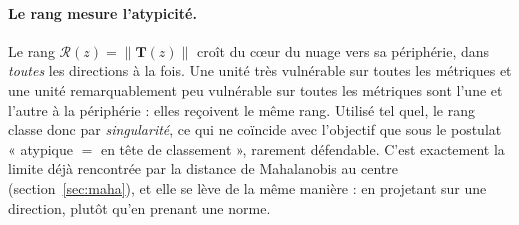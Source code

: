 \documentclass[11pt,a4paper]{article}
\theoremstyle{definition}
\theoremstyle{remark}
\newcommand{\norm}[1]{\left\lVert #1 \right\rVert}
\newcommand{\Tmap}{\mathbf{T}}
\begin{document}
\medskip

\paragraph{Le rang mesure l'atypicité.} Le rang $\mathcal{R}(z) = \norm{\Tmap(z)}$ croît du
c\oe ur du nuage vers sa périphérie, dans \emph{toutes} les directions à la fois. Une unité
très vulnérable sur toutes les métriques et une unité remarquablement peu vulnérable sur
toutes les métriques sont l'une et l'autre à la périphérie : elles reçoivent le même rang.
Utilisé tel quel, le rang classe donc par \emph{singularité}, ce qui ne coïncide avec
l'objectif que sous le postulat « atypique $=$ en tête de classement », rarement défendable.
C'est exactement la limite déjà rencontrée par la distance de Mahalanobis au centre
(section~\ref{sec:maha}), et elle se lève de la même manière : en projetant sur une
direction, plutôt qu'en prenant une norme.

\medskip
\end{document}
